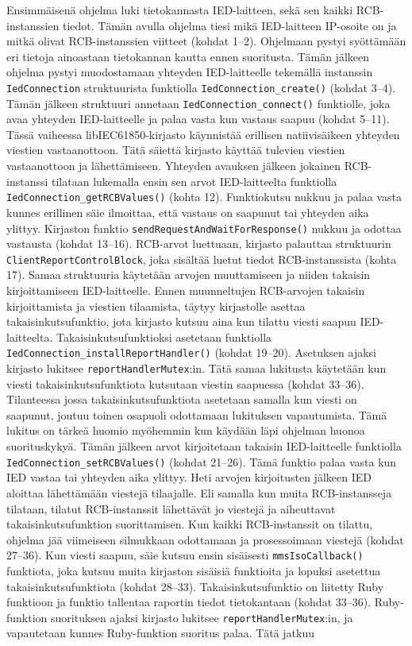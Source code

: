 Ensimmäisenä ohjelma luki tietokannasta IED-laitteen, sekä sen kaikki RCB-instanssien tiedot. Tämän avulla ohjelma tiesi mikä IED-laitteen IP-osoite on ja mitkä olivat RCB-instanssien viitteet (kohdat 1--2). Ohjelmaan pystyi syöttämään eri tietoja ainoastaan tietokannan kautta ennen suoritusta. Tämän jälkeen ohjelma pystyi muodostamaan yhteyden IED-laitteelle tekemällä instanssin \texttt{IedCon\-nec\-ti\-on} struktuurista funktiolla \texttt{Ied\-Con\-nec\-ti\-on\_crea\-te\-()} (kohdat 3--4). Tämän jälkeen struktuuri annetaan \texttt{Ied\-Con\-nec\-ti\-on\-\_\-con\-nect\-()} funktiolle, joka avaa yhteyden IED-laitteelle ja palaa vasta kun vastaus saapuu (kohdat 5--11). Tässä vaiheessa libIEC61850-kirjasto käynnistää erillisen natiivisäikeen yhteyden viestien vastaanottoon. Tätä säiettä kirjasto käyttää tulevien viestien vastaanottoon ja lähettämiseen. Yhteyden avauksen jälkeen jokainen RCB-instanssi tilataan lukemalla ensin sen arvot IED-laitteelta funktiolla \texttt{Ied\-Con\-nec\-ti\-on\-\_\-get\-RCB\-Va\-lu\-es\-()} (kohta 12). Funktiokutsu nukkuu ja palaa vasta kunnes erillinen säie ilmoittaa, että vastaus on saapunut tai yhteyden aika ylittyy. Kirjaston funktio  \texttt{send\-Re\-qu\-est\-And\-Wait\-For\-Res\-pon\-se\-()} nukkuu ja odottaa vastausta (kohdat 13--16). RCB-arvot luettuaan, kirjasto palauttaa struktuurin \texttt{Cli\-ent\-Re\-port\-Cont\-rol\-Block}, joka sisältää luetut tiedot RCB-instanssista (kohta 17). Samaa struktuuria käytetään arvojen muuttamiseen ja niiden takaisin kirjoittamiseen IED-laitteelle. Ennen muunneltujen RCB-arvojen takaisin kirjoittamista ja viestien tilaamista, täytyy kirjastolle asettaa takaisinkutsufunktio, jota kirjasto kutsuu aina kun tilattu viesti saapuu IED-laitteelta. Takaisinkutsufunktioksi asetetaan funktiolla \texttt{Ied\-Con\-nec\-ti\-on\-\_\-ins\-tall\-Re\-port\-Hand\-ler\-()} (kohdat 19--20). Asetuksen ajaksi kirjasto lukitsee \texttt{re\-port\-Hand\-ler\-Mu\-tex}:in. Tätä samaa lukitusta käytetään kun viesti takaisinkutsufunktiota kutsutaan viestin saapuessa (kohdat 33--36). Tilanteessa jossa takaisinkutsufunktiota asetetaan samalla kun viesti on saapunut, joutuu toinen osapuoli odottamaan lukituksen vapautumista. Tämä lukitus on tärkeä huomio myöhemmin kun käydään läpi ohjelman huonoa suorituskykyä. Tämän jälkeen arvot kirjoitetaan takaisin IED-laitteelle funktiolla \texttt{Ied\-Con\-nec\-ti\-on\-\_\-set\-RCB\-Va\-lu\-es\-()} (kohdat 21--26). Tämä funktio palaa vasta kun IED vastaa tai yhteyden aika ylittyy. Heti arvojen kirjoitusten jälkeen IED aloittaa lähettämään viestejä tilaajalle. Eli samalla kun muita RCB-instansseja tilataan, tilatut RCB-instanssit lähettävät jo viestejä ja aiheuttavat takaisinkutsufunktion suorittamisen. Kun kaikki RCB-instanssit on tilattu, ohjelma jää viimeiseen silmukkaan odottamaan ja prosessoimaan viestejä (kohdat 27--36). Kun viesti saapuu, säie kutsuu ensin sisäisesti \texttt{mms\-I\-so\-Call\-back\-()} funktiota, joka kutsuu muita kirjaston sisäisiä funktioita ja lopuksi asetettua takaisinkutsufunktiota (kohdat 28--33). Takaisinkutsufunktio on liitetty Ruby funktioon ja funktio tallentaa raportin tiedot tietokantaan (kohdat 33--36). Ruby-funktion suorituksen ajaksi kirjasto lukitsee \texttt{re\-port\-Hand\-ler\-Mu\-tex}:in, ja vapautetaan kunnes Ruby-funktion suoritus palaa. Tätä jatkuu 